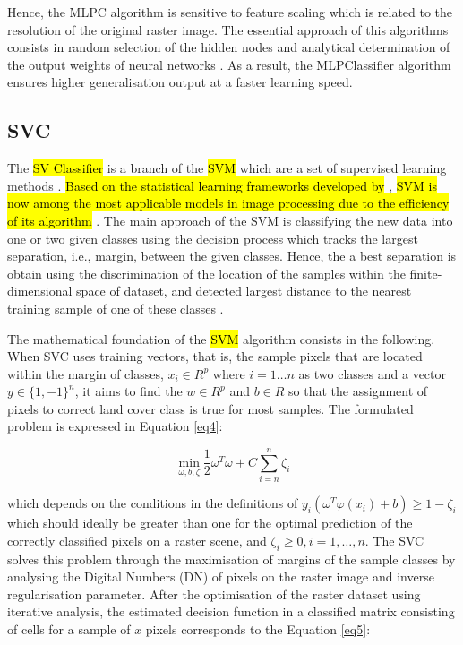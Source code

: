 \documentclass[final,5p,times,twocolumn]{elsarticle}
\numberwithin{table}{section}
\begin{document}
Hence, the MLPC algorithm is sensitive to feature scaling which is related to the resolution of the original raster image. The essential approach of this algorithms consists in random selection of the hidden nodes and analytical determination of the output weights of neural networks \cite{HUANG2006489}. As a result, the MLPClassifier algorithm ensures higher generalisation output at a faster learning speed. 

\subsection{SVC}

The \hl{SV Classifier} is a branch of the \hl{SVM} which are a set of supervised learning methods \cite{Cortes}. \hl{Based on the statistical learning frameworks developed by} \cite{Vapnik}, \hl{SVM is now among the most applicable models in image processing due to the efficiency of its algorithm} \cite{chandra2021survey}. The main approach of the SVM is classifying the new data into one or two given classes using the decision process which tracks the largest separation, i.e., margin, between the given classes. Hence, the a best separation is obtain using the discrimination of the location of the samples within the finite-dimensional space of dataset, and detected largest distance to the nearest training sample of one of these classes \cite{6069282,earth5030024}.

The mathematical foundation of the \hl{SVM} algorithm consists in the following. When SVC uses training vectors, that is, the sample pixels that are located within the margin of classes,
$x_{i} \in R^p$ where $ i=1 \dots n$ as two classes and a vector $y \in \{1, - 1\}^n$, it aims to find the $w \in R^p$ and $b \in R$ so that the assignment of pixels to correct land cover class is true for most samples. The formulated problem is expressed in Equation \ref{eq4}:

\begin{equation}
\min_{\omega,b,\zeta}\frac{1}{2}\omega^T\omega+C\sum_{i=n}^{n}\zeta_{i}
\label{eq4}
\end{equation}

which depends on the conditions in the definitions of $y_{i}(\omega^{T}\varphi (x_i) + b)\geq 1-\zeta_{i}$ which should ideally be greater than one for the optimal prediction of the correctly classified pixels on a raster scene, and $\zeta_{i}\geq 0, i = 1,\dots,n$. The SVC solves this problem through the maximisation of margins of the sample classes by analysing the Digital Numbers (DN) of pixels on the raster image and inverse regularisation parameter. After the optimisation of the raster dataset using iterative analysis, the estimated decision function in a classified matrix consisting of cells for a sample of $x$ pixels corresponds to the Equation \ref{eq5}:
\end{document}
